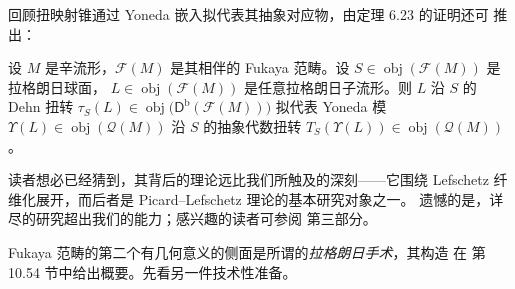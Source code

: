 回顾扭映射锥通过 Yoneda 嵌入拟代表其抽象对应物，由定理 6.23 的证明还可
推出：

\begin{Cor}\label{cor:6.24}
设 $M$ 是辛流形，$\mathcal F(M)$ 是其相伴的 Fukaya 范畴。设
$S\in\operatorname{obj}(\mathcal F(M))$ 是拉格朗日球面，
$L\in\operatorname{obj}(\mathcal F(M))$ 是任意拉格朗日子流形。则 $L$ 沿
$S$ 的 Dehn 扭转 $\tau_S(L)\in\operatorname{obj}\bigl(\mathsf D^{\mathrm b}
(\mathcal F(M))\bigr)$ 拟代表 Yoneda 模
$\Upsilon(L)\in\operatorname{obj}(\mathcal Q(M))$ 沿 $S$ 的抽象代数扭转
$T_S(\Upsilon(L))\in\operatorname{obj}(\mathcal Q(M))$。
\end{Cor}

读者想必已经猜到，其背后的理论远比我们所触及的深刻——它围绕
Lefschetz 纤维化展开，而后者是 Picard--Lefschetz 理论的基本研究对象之一。
遗憾的是，详尽的研究超出我们的能力；感兴趣的读者可参阅 \cite{Sei08}
第三部分。

Fukaya 范畴的第二个有几何意义的侧面是所谓的\emph{拉格朗日手术}，其构造
在 \cite{FOOO07} 第 10.54 节中给出概要。先看另一件技术性准备。

